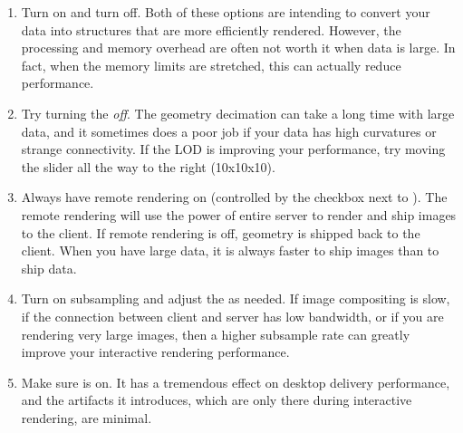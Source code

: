 \begin{enumerate}
\item Turn  on and turn  off.  Both of these options are intending to convert your data
  into structures that are more efficiently rendered.  However, the
  processing and memory overhead are often not worth it when data is large.
  In fact, when the memory limits are stretched, this can actually reduce
  performance.
\item Try turning the  \emph{off}.  The geometry
  decimation can take a long time with large data, and it sometimes does a
  poor job if your data has high curvatures or strange connectivity.  If
  the LOD is improving your performance, try moving the  slider all the way to the right (10x10x10).
\item Always have remote rendering on (controlled by the checkbox next to
  ).  The remote rendering will use the power
  of entire server to render and ship images to the client.  If remote
  rendering is off, geometry is shipped back to the client.  When you have
  large data, it is always faster to ship images than to ship data.
\item Turn on subsampling and adjust the  as needed.
  If image compositing is slow, if the connection between client and server
  has low bandwidth, or if you are rendering very large images, then a
  higher subsample rate can greatly improve your interactive rendering
  performance.
\item Make sure  is on.  It has a tremendous effect
  on desktop delivery performance, and the artifacts it introduces, which
  are only there during interactive rendering, are minimal.
\end{enumerate}


